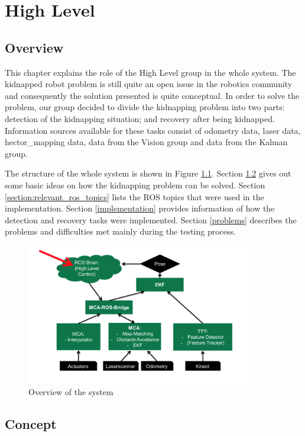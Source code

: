 \chapter{High Level}

\section{Overview}
This chapter explains the role of the High Level group in the whole system. The kidnapped robot problem is still quite an open issue in the robotics community and consequently the solution presented is quite conceptual. In order to solve the problem, our group decided to divide the kidnapping problem into two parts: detection of the kidnapping situation; and recovery after being kidnapped. Information sources available for these tasks consist of odometry data, laser data, hector\_mapping data, data from the Vision group and data from the Kalman group.

The structure of the whole system is shown in Figure \ref{System}. Section \ref{section:concept} gives out some basic ideas on how the kidnapping problem can be solved. Section \ref{section:relevant_ros_topics} lists the ROS topics that were used in the implementation. Section \ref{implementation} provides information of how the detection and recovery tasks were implemented. Section \ref{problems} describes the problems and difficulties met mainly during the testing process.

\begin{figure}[htb]
\centering
\includegraphics[width=0.9\textwidth]{graphics/system.png}
\caption{Overview of the system}
\label{System}
\centering
\end{figure}

\section{Concept} \label{section:concept}
